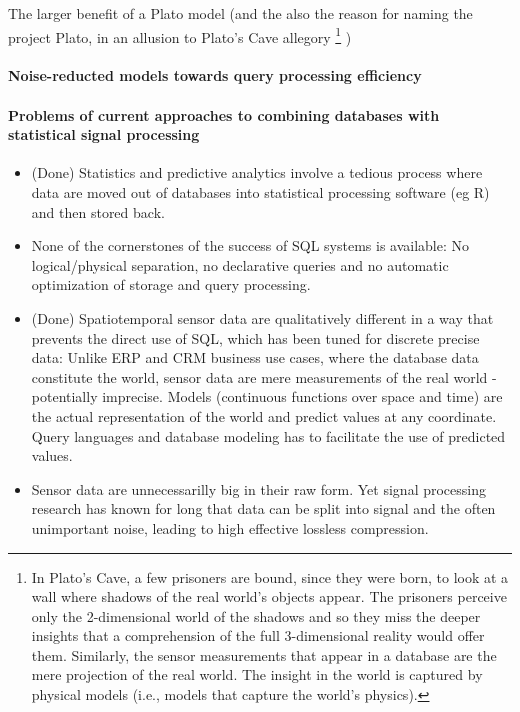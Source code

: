 
The larger benefit of a Plato model (and the also the reason for naming the project Plato, in an allusion to Plato's Cave allegory%
\footnote{In Plato's Cave, a few prisoners are bound, since they were born, to look at a wall where shadows of the real world's objects appear. The prisoners perceive only the 2-dimensional world of the shadows and so they miss the deeper insights that a comprehension of the full 3-dimensional reality would offer them. Similarly, the sensor measurements that appear in a database are the mere projection of the real world. The insight in the world is captured by physical models (i.e., models that capture the world's physics). 
}
)

\paragraph{Noise-reducted models towards query processing efficiency}





\paragraph{Problems of current approaches to combining databases with statistical signal processing}
\begin{itemize}
\item (Done) Statistics and predictive analytics involve a tedious process where data are moved out of databases into statistical processing software (eg R) and then stored back.
%
\item None of the cornerstones of the success of SQL systems is available: No logical/physical separation, no declarative queries and no automatic optimization of storage and query processing.
%
\item (Done) Spatiotemporal sensor data are qualitatively different in a way that prevents the direct use of SQL, which has been tuned for discrete precise data: Unlike ERP and CRM business use cases, where the database data constitute the world, sensor data are mere measurements of the real world - potentially imprecise. Models (continuous functions over space and time) are the actual representation of the world and predict values at any coordinate. Query languages and database modeling has to facilitate the use of predicted values.
%
\item Sensor data are unnecessarilly big in their raw form. Yet signal processing research has known for long that data can be split into signal and the often unimportant noise, leading to high effective lossless compression. 
%
\end{itemize}

